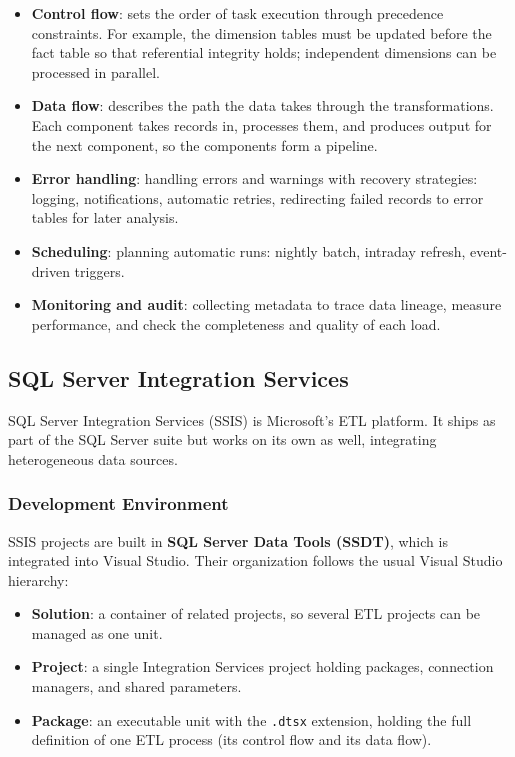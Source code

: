 \begin{itemize}
    \item \textbf{Control flow}: sets the order of task execution through precedence constraints. For example, the dimension tables must be updated before the fact table so that referential integrity holds; independent dimensions can be processed in parallel.

    \item \textbf{Data flow}: describes the path the data takes through the transformations. Each component takes records in, processes them, and produces output for the next component, so the components form a pipeline.

    \item \textbf{Error handling}: handling errors and warnings with recovery strategies: logging, notifications, automatic retries, redirecting failed records to error tables for later analysis.

    \item \textbf{Scheduling}: planning automatic runs: nightly batch, intraday refresh, event-driven triggers.

    \item \textbf{Monitoring and audit}: collecting metadata to trace data lineage, measure performance, and check the completeness and quality of each load.
\end{itemize}

\subsection{SQL Server Integration Services}
\label{sec:ssis}

SQL Server Integration Services (SSIS) is Microsoft's ETL platform. It ships as part of the SQL Server suite but works on its own as well, integrating heterogeneous data sources.

\subsubsection{Development Environment}
\label{subsec:ssis-environment}

SSIS projects are built in \textbf{SQL Server Data Tools (SSDT)}, which is integrated into Visual Studio. Their organization follows the usual Visual Studio hierarchy:

\begin{itemize}
    \item \textbf{Solution}: a container of related projects, so several ETL projects can be managed as one unit.
    \item \textbf{Project}: a single Integration Services project holding packages, connection managers, and shared parameters.
    \item \textbf{Package}: an executable unit with the \texttt{.dtsx} extension, holding the full definition of one ETL process (its control flow and its data flow).
\end{itemize}

